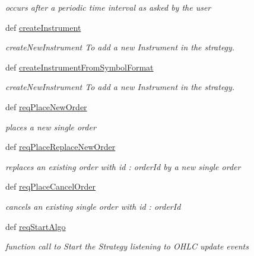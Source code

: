 \begin{DoxyCompactItemize}
\begin{DoxyCompactList}\small\item\em occurs after a periodic time interval as asked by the user \end{DoxyCompactList}\item 
def \hyperlink{classmuTradePyBase_1_1CustomStrategy_a37a7abc5e085f6eadba1e4663f144ab0}{create\-Instrument}
\begin{DoxyCompactList}\small\item\em create\-New\-Instrument To add a new Instrument in the strategy. \end{DoxyCompactList}\item 
def \hyperlink{classmuTradePyBase_1_1CustomStrategy_a8c29e9de1e8262dcc2988fa40d2760d6}{create\-Instrument\-From\-Symbol\-Format}
\begin{DoxyCompactList}\small\item\em create\-New\-Instrument To add a new Instrument in the strategy. \end{DoxyCompactList}\item 
def \hyperlink{classmuTradePyBase_1_1CustomStrategy_a55cfc91c1238c21c6fe84c3ea2fb6040}{req\-Place\-New\-Order}
\begin{DoxyCompactList}\small\item\em places a new single order \end{DoxyCompactList}\item 
def \hyperlink{classmuTradePyBase_1_1CustomStrategy_ab7410ea1556987251083ec8cd97ea9cc}{req\-Place\-Replace\-New\-Order}
\begin{DoxyCompactList}\small\item\em replaces an existing order with id \-: order\-Id by a new single order \end{DoxyCompactList}\item 
def \hyperlink{classmuTradePyBase_1_1CustomStrategy_a6f326409830d2c7a7463eed7c356f070}{req\-Place\-Cancel\-Order}
\begin{DoxyCompactList}\small\item\em cancels an existing single order with id \-: order\-Id \end{DoxyCompactList}\item 
def \hyperlink{classmuTradePyBase_1_1CustomStrategy_a0a0951d41f3700be8a501506ec802f96}{req\-Start\-Algo}
\begin{DoxyCompactList}\small\item\em function call to Start the Strategy listening to O\-H\-L\-C update events \end{DoxyCompactList}\item 

\end{DoxyCompactItemize}

